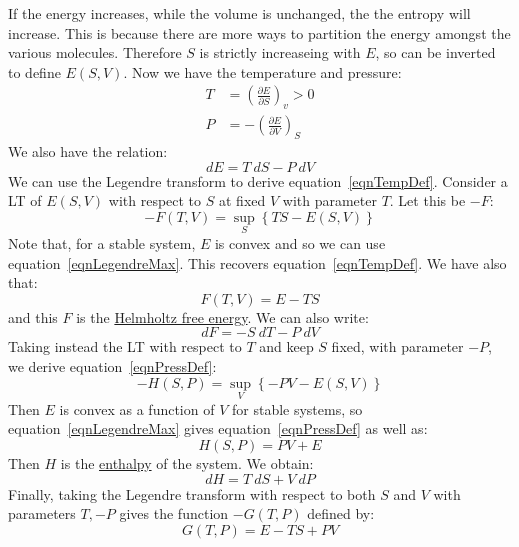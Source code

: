 \documentclass[../Main.tex]{subfiles}
\begin{document}
If the energy increases, while the volume is unchanged, the the entropy will increase. This is because there are more ways to partition the energy amongst the various molecules. Therefore $S$ is strictly increaseing with $E$, so can be inverted to define $E(S, V)$. Now we have the temperature and pressure:
\begin{align}
    T &= \left(\frac{\partial E}{\partial S}\right)_v > 0 \label{eqnTempDef} \\
    P &= -\left(\frac{\partial E}{\partial V}\right)_S \label{eqnPressDef}
\end{align}
We also have the relation:
\begin{equation}
    dE = T~dS - P~dV
    \label{eqnThermoRelation}
\end{equation}
We can use the Legendre transform to derive equation~\ref{eqnTempDef}. Consider a LT of $E(S, V)$ with respect to $S$ at fixed $V$ with parameter $T$. Let this be $-F$:
\begin{equation*}
    -F(T, V) = \sup_S \left\{TS - E(S, V)\right\}
\end{equation*}
Note that, for a stable system, $E$ is convex and so we can use equation~\ref{eqnLegendreMax}. This recovers equation~\ref{eqnTempDef}. We have also that:
\begin{equation}
    F(T, V) = E - TS
    \label{eqnHFreeEnergy}
\end{equation}
and this $F$ is the \underline{Helmholtz free energy}. We can also write:
\begin{equation*}
    dF = -S~dT - P~dV
\end{equation*}
Taking instead the LT with respect to $T$ and keep $S$ fixed, with parameter $-P$, we derive equation~\ref{eqnPressDef}:
\begin{equation*}
    -H(S, P) = \sup_V \left\{-PV - E(S, V)\right\}
\end{equation*}
Then $E$ is convex as a function of $V$ for stable systems, so equation~\ref{eqnLegendreMax} gives equation~\ref{eqnPressDef} as well as:
\begin{equation*}
    H(S, P) = PV + E
\end{equation*}
Then $H$ is the \underline{enthalpy} of the system. We obtain:
\begin{equation}
    dH = T~dS + V~dP 
    \label{eqnEnthalphyDiff}
\end{equation}
Finally, taking the Legendre transform with respect to both $S$ and $V$ with parameters $T, -P$ gives the function $-G(T, P)$ defined by:
\begin{equation*}
    G(T, P) = E - TS + PV
\end{equation*}
\end{document}
